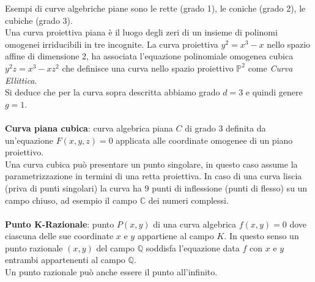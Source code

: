 \documentclass[a4paper,12pt]{tesiinfo}
\begin{document}
Esempi di curve algebriche piane sono le rette (grado 1), le coniche (grado 2), le cubiche (grado 3).
\\
Una curva proiettiva piana \`e il luogo degli zeri di un insieme di polinomi omogenei irriducibili in tre incognite. La curva proiettiva $y^2 = x^3 -x$ nello spazio affine di dimensione 2, ha associata l'equazione polinomiale omogenea cubica $y^2z = x^3 - xz^2$ che definisce una curva nello spazio proiettivo $\mathbb{P}^2$ come \textit{Curva Ellittica}. 
\\
Si deduce che per la curva sopra descritta abbiamo grado $d = 3$ e quindi genere $g = 1$.
\\\\
%
%
%
\textbf{Curva piana cubica}: curva algebrica piana $C$ di grado 3 definita da un'equazione $F(x, y, z) = 0$ applicata alle coordinate omogenee di un piano proiettivo. 
\\
Una curva cubica pu\`o presentare un punto singolare, in questo caso assume la parametrizzazione in termini di una retta proiettiva. In caso di una curva liscia (priva di punti singolari) la curva ha 9 punti di inflessione (punti di flesso) su un campo chiuso, ad esempio il campo $\mathbb{C}$ dei numeri complessi. 
\\\\
%
%
%
\textbf{Punto $\mathbold{K}$-Razionale}: punto $P(x, y)$ di una curva algebrica $f(x, y)=0$ dove ciascuna delle sue coordinate $x$ e $y$ appartiene al campo $K$. In questo senso un punto razionale $(x, y)$ del campo $\mathbb{Q}$ soddisfa l'equazione data $f$ con $x$ e $y$ entrambi appartenenti al campo $\mathbb{Q}$. 
\\
Un punto razionale pu\`o anche essere il punto all'infinito.
%
%
%
%
%
%
%
%
%
%
\end{document}

